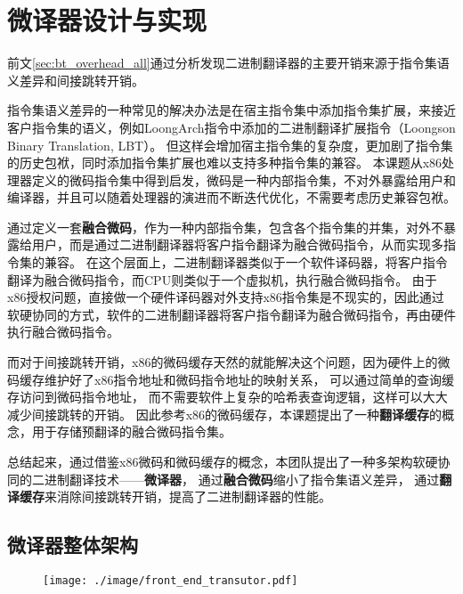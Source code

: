 \chapter{微译器设计与实现}\label{chap:MUT}

前文\ref{sec:bt_overhead_all}通过分析发现二进制翻译器的主要开销来源于指令集语义差异和间接跳转开销。

指令集语义差异的一种常见的解决办法是在宿主指令集中添加指令集扩展，来接近客户指令集的语义，例如LoongArch指令中添加的二进制翻译扩展指令（Loongson Binary Translation, LBT）\cite{LoongArch2023}。
但这样会增加宿主指令集的复杂度，更加剧了指令集的历史包袱，同时添加指令集扩展也难以支持多种指令集的兼容。
本课题从x86处理器定义的微码指令集中得到启发，微码是一种内部指令集，不对外暴露给用户和编译器，并且可以随着处理器的演进而不断迭代优化，不需要考虑历史兼容包袱。

通过定义一套\textbf{融合微码}，作为一种内部指令集，包含各个指令集的并集，对外不暴露给用户，而是通过二进制翻译器将客户指令翻译为融合微码指令，从而实现多指令集的兼容。
在这个层面上，二进制翻译器类似于一个软件译码器，将客户指令翻译为融合微码指令，而CPU则类似于一个虚拟机，执行融合微码指令。
由于x86授权问题，直接做一个硬件译码器对外支持x86指令集是不现实的，因此通过软硬协同的方式，软件的二进制翻译器将客户指令翻译为融合微码指令，再由硬件执行融合微码指令。

而对于间接跳转开销，x86的微码缓存天然的就能解决这个问题，因为硬件上的微码缓存维护好了x86指令地址和微码指令地址的映射关系，
可以通过简单的查询缓存访问到微码指令地址，
而不需要软件上复杂的哈希表查询逻辑，这样可以大大减少间接跳转的开销。
因此参考x86的微码缓存，本课题提出了一种\textbf{翻译缓存}的概念，用于存储预翻译的融合微码指令集。

总结起来，通过借鉴x86微码和微码缓存的概念，本团队提出了一种多架构软硬协同的二进制翻译技术——\textbf{微译器}，
通过\textbf{融合微码}缩小了指令集语义差异，
通过\textbf{翻译缓存}来消除间接跳转开销，提高了二进制翻译器的性能。

\section{微译器整体架构}

\begin{figure}[!htbp]
  \centering
  \texttt{[image: ./image/front\_end\_transutor.pdf]}
  \label{img:front_end_transutor}
\end{figure}

